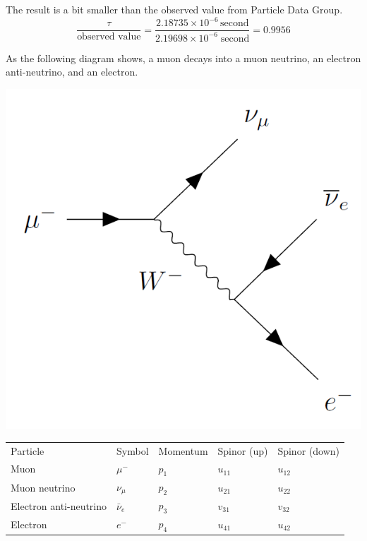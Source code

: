 The result is a bit smaller than the observed value from Particle Data Group.
\begin{equation*}
\frac{\tau}{\text{observed value}}
=\frac{2.18735\times10^{-6}\,\text{second}}{2.19698\times10^{-6}\;\text{second}}=0.9956
\end{equation*}

As the following diagram shows, a muon decays into a muon neutrino, an electron anti-neutrino,
and an electron.
\begin{center}
\includegraphics[scale=0.25]{muon-decay-diagram.png}
\end{center}

\begin{center}
\begin{tabular}{lllll}
Particle & Symbol & Momentum & Spinor (up) & Spinor (down)
\\[2ex]
Muon & $\mu^-$ & $p_1$ & $u_{11}$ & $u_{12}$
\\
Muon neutrino & $\nu_\mu$ & $p_2$ & $u_{21}$ & $u_{22}$
\\
Electron anti-neutrino & $\bar{\nu}_e$ & $p_3$ & $v_{31}$ & $v_{32}$
\\
Electron & $e^-$ & $p_4$ & $u_{41}$ & $u_{42}$
\end{tabular}
\end{center}

